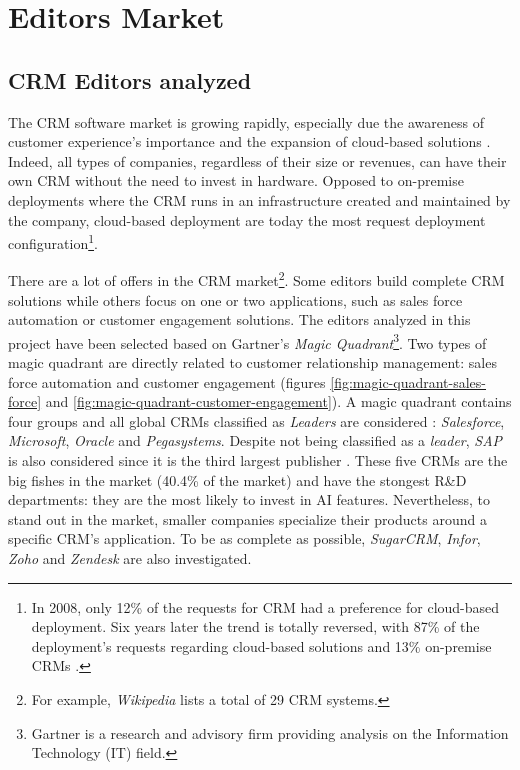 \section{Editors Market}


\subsection{CRM Editors analyzed}
The CRM software market is growing rapidly, especially due the awareness of customer experience's importance and the expansion of cloud-based solutions \cite{crm-revenue}. Indeed, all types of companies, regardless of their size or revenues, can have their own CRM without the need to invest in hardware. Opposed to on-premise deployments where the CRM runs in an infrastructure created and maintained by the company, cloud-based deployment are today the most request deployment configuration\footnote{In 2008, only 12\% of the requests for CRM had a preference for cloud-based deployment. Six years later the trend is totally reversed, with 87\% of the deployment's requests regarding cloud-based solutions and 13\% on-premise CRMs \cite{crm-deployment-stats}.}.

There are a lot of offers in the CRM market\footnote{For example, \textit{Wikipedia} lists a total of 29 CRM systems.}. Some editors build complete CRM solutions while others focus on one or two applications, such as sales force automation or customer engagement solutions. The editors analyzed in this project have been selected based on Gartner's \textit{Magic Quadrant}\footnote{Gartner is a research and advisory firm providing analysis on the Information Technology (IT) field.}. Two types of magic quadrant are directly related to customer relationship management: sales force automation and customer engagement (figures \ref{fig:magic-quadrant-sales-force} and \ref{fig:magic-quadrant-customer-engagement}). A magic quadrant contains four groups and all global CRMs classified as \textit{Leaders} are considered : \textit{Salesforce}, \textit{Microsoft}, \textit{Oracle} and \textit{Pegasystems}. Despite not being classified as a \textit{leader}, \textit{SAP} is also considered since it is the third largest publisher \cite{crm-market-share}. These five CRMs are the big fishes in the market (40.4\% of the market) and have the stongest R\&D departments: they are the most likely to invest in AI features. Nevertheless, to stand out in the market, smaller companies specialize their products around a specific CRM's application. To be as complete as possible, \textit{SugarCRM}, \textit{Infor}, \textit{Zoho} and \textit{Zendesk} are also investigated.

